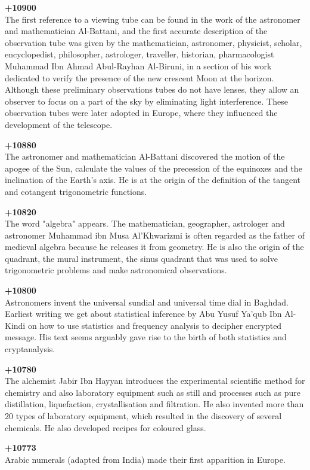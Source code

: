 \textbf{+10900}\\
The first reference to a viewing tube can be found in the work of the astronomer and mathematician Al-Battani, and the first accurate description of the observation tube was given by the mathematician, astronomer, physicist, scholar, encyclopedist, philosopher, astrologer, traveller, historian, pharmacologist Muhammad Ibn Ahmad Abul-Rayhan Al-Biruni, in a section of his work dedicated to verify the presence of the new crescent Moon at the horizon. Although these preliminary observations tubes do not have lenses, they allow an observer to focus on a part of the sky by eliminating light interference. These observation tubes were later adopted in Europe, where they influenced the development of the telescope.

\textbf{+10880}\\
The astronomer and mathematician Al-Battani discovered the motion of the apogee of the Sun, calculate the values of the precession of the equinoxes and the inclination of the Earth's axis. He is at the origin of the definition of the tangent and cotangent trigonometric functions.

\textbf{+10820}\\
The word "algebra" appears. The mathematician, geographer, astrologer and astronomer Muhammad ibn Musa Al'Khwarizmi is often regarded as the father of medieval algebra because he releases it from geometry. He is also the origin of the quadrant, the mural instrument, the sinus quadrant that was used to solve trigonometric problems and make astronomical observations.

\textbf{+10800}\\
Astronomers invent the universal sundial and universal time dial in Baghdad. Earliest writing we get about statistical inference by Abu Yusuf Ya'qub Ibn Al-Kindi on how to use statistics and frequency analysis to decipher encrypted message. His text seems arguably gave rise to the birth of both statistics and cryptanalysis.

\textbf{+10780}\\
The alchemist Jabir Ibn Hayyan introduces the experimental scientific method for chemistry and also laboratory equipment such as still and processes such as pure distillation, liquefaction, crystallisation and filtration. He also invented more than 20 types of laboratory equipment, which resulted in the discovery of several chemicals. He also developed recipes for coloured glass.

\textbf{+10773}\\
Arabic numerals (adapted from India) made their first apparition in Europe.

